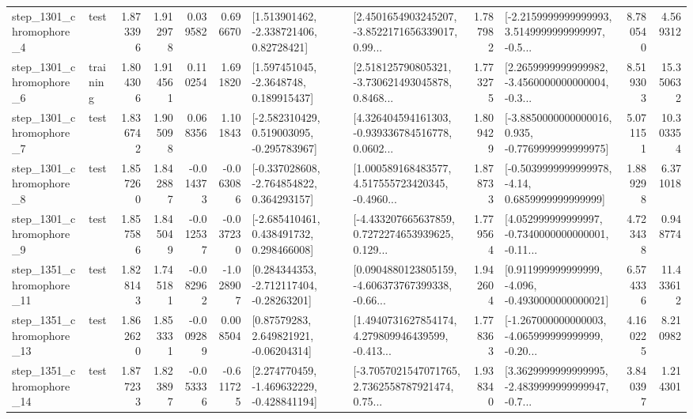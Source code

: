 \begin{tabular}{llrrrrllrlrr}
  step\_1301\_chromophore\_4 &      test &      1.873396 &    1.912978 &      0.039582 &  0.696670 &     [1.513901462, -2.338721406, 0.82728421] &  [2.4501654903245207, -3.8522171656339017, 0.99... &       1.787982 &  [-2.2159999999999993, 3.5149999999999997, -0.5... &            8.780540 &          4.569312 \\
  step\_1301\_chromophore\_6 &  training &      1.804306 &    1.914561 &      0.110254 &  1.691820 &      [1.597451045, -2.3648748, 0.189915437] &  [2.518125790805321, -3.730621493045878, 0.8468... &       1.773275 &  [2.2659999999999982, -3.4560000000000004, -0.3... &            8.519303 &         15.350632 \\
  step\_1301\_chromophore\_7 &      test &      1.836742 &    1.905098 &      0.068356 &  1.101843 &   [-2.582310429, 0.519003095, -0.295783967] &  [4.326404594161303, -0.939336784516778, 0.0602... &       1.809429 &  [-3.8850000000000016, 0.935, -0.7769999999999975] &            5.071151 &         10.303354 \\
  step\_1301\_chromophore\_8 &      test &      1.857260 &    1.842887 &     -0.014373 & -0.063086 &   [-0.337028608, -2.764854822, 0.364293157] &  [1.000589168483577, 4.517555723420345, -0.4960... &       1.878733 &   [-0.5039999999999978, -4.14, 0.6859999999999999] &            1.889298 &          6.371018 \\
  step\_1301\_chromophore\_9 &      test &      1.857586 &    1.845049 &     -0.012537 & -0.037230 &    [-2.685410461, 0.438491732, 0.298466008] &  [-4.433207665637859, 0.7272274653939625, 0.129... &       1.779564 &  [4.052999999999997, -0.7340000000000001, -0.11... &            4.723438 &          0.948774 \\
 step\_1351\_chromophore\_11 &      test &      1.828143 &    1.745181 &     -0.082962 & -1.028907 &    [0.284344353, -2.712117404, -0.28263201] &  [0.0904880123805159, -4.606373767399338, -0.66... &       1.942604 &   [0.911999999999999, -4.096, -0.4930000000000021] &            6.574336 &         11.433612 \\
 step\_1351\_chromophore\_13 &      test &      1.862620 &    1.853331 &     -0.009289 &  0.008504 &      [0.87579283, 2.649821921, -0.06204314] &  [1.4940731627854174, 4.279809946439599, -0.413... &       1.778363 &  [-1.267000000000003, -4.065999999999999, -0.20... &            4.160225 &          8.210982 \\
 step\_1351\_chromophore\_14 &      test &      1.877233 &    1.823897 &     -0.053336 & -0.611725 &   [2.274770459, -1.469632229, -0.428841194] &  [-3.7057021547071765, 2.7362558787921474, 0.75... &       1.938340 &  [3.3629999999999995, -2.4839999999999947, -0.7... &            3.840397 &          1.214301 \\

\end{tabular}
